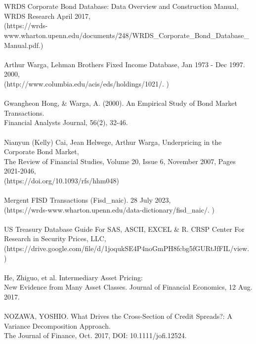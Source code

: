 \documentclass{article}
\begin{document}


\\\\
[1] WRDS Corporate Bond Database: Data Overview and Construction Manual, WRDS Research April 2017,\\
(https://wrds-www.wharton.upenn.edu/documents/248/WRDS_Corporate_Bond_Database_Manual.pdf.)
\\\\
[2] Arthur Warga, Lehman Brothers Fixed Income Database, Jan 1973 - Dec 1997. 2000, \\(http://www.columbia.edu/acis/eds/holdings/1021/. )
\\\\
[3] Gwangheon Hong, & Warga, A. (2000). An Empirical Study of Bond Market Transactions. \\Financial Analysts Journal, 56(2), 32-46.
\\\\
[4] Nianyun (Kelly) Cai, Jean Helwege, Arthur Warga, Underpricing in the Corporate Bond Market, \\The Review of Financial Studies, Volume 20, Issue 6, November 2007, Pages 2021-2046, \\(https://doi.org/10.1093/rfs/hhm048)
\\\\
[5] Mergent FISD Transactions (Fisd_naic). 28 July 2023,\\ (https://wrds-www.wharton.upenn.edu/data-dictionary/fisd_naic/. )
\\\\
[6] US  Treasury Database Guide For SAS, ASCII, EXCEL \& R. CRSP Center For Research in Security Prices, LLC, \\(https://drive.google.com/file/d/1joqukSE4P4noGmPH8fcbg5fGURtJfFIL/view. )
\\\\
[7] He, Zhiguo, et al. Intermediary Asset Pricing: \\New Evidence from Many Asset Classes. Journal of Financial Economics, 12 Aug. 2017. 
\\\\
[8] NOZAWA, YOSHIO. What Drives the Cross-Section of Credit Spreads?: A   Variance Decomposition Approach. \\The Journal of Finance, Oct. 2017, DOI: 10.1111/jofi.12524. 
\end{document}
